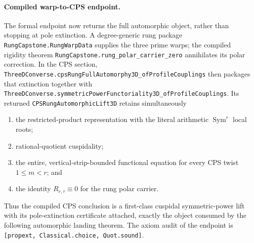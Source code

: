 \documentclass[11pt]{article}
\theoremstyle{definition}
\newcommand{\Sym}{\operatorname{Sym}}
\begin{document}
\paragraph{Compiled warp-to-CPS endpoint.}
The formal endpoint now returns the full automorphic object, rather than stopping at
pole extinction.  A degree-generic rung package
\texttt{RungCapstone.RungWarpData} supplies the three prime warps; the compiled rigidity theorem
\texttt{RungCapstone.rung\_polar\_carrier\_zero} annihilates its polar correction.  In the CPS
section, \texttt{ThreeDConverse.cpsRungFullAutomorphy3D\_ofProfileCouplings} then packages that
extinction together with
\texttt{ThreeDConverse.symmetricPowerFunctoriality3D\_ofProfileCouplings}.  Its returned
\texttt{CPSRungAutomorphicLift3D} retains simultaneously
\begin{enumerate}
\item the restricted-product representation with the literal arithmetic $\Sym^r$ local roots;
\item rational-quotient cuspidality;
\item the entire, vertical-strip-bounded functional equation for every CPS twist
$1\le m<r$; and
\item the identity $R_{r,\tau}\equiv0$ for the rung polar carrier.
\end{enumerate}
Thus the compiled CPS conclusion is a first-class cuspidal symmetric-power lift with its
pole-extinction certificate attached, exactly the object consumed by the following automorphic
landing theorem.  The axiom audit of the endpoint is
\texttt{[propext, Classical.choice, Quot.sound]}.
\end{document}
